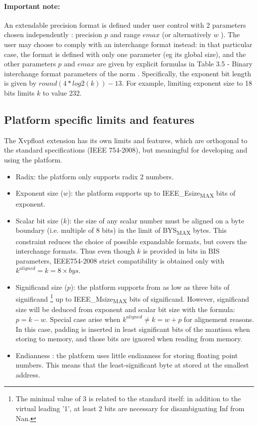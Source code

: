 \paragraph{Important note:} An extendable precision format is defined under user control with 2 parameters chosen independently : precision $p$ and range $emax$ (or alternatively $w$ ).
The user may choose to comply with an interchange format instead: in that particular case, the format is defined with only one parameter (eg its global size), and the other parameters $p$ and $emax$ are given by explicit formulas in Table 3.5 - Binary interchange format parameters of the norm \cite{IEEE754}.
Specifically, the exponent bit length is given by $round(4*log2(k))-13$. 
For example, limiting exponent size to 18 bits limits $k$ to value 232.

\subsection{Platform specific limits and features}

The Xvpfloat extension has its own limits and features, which are orthogonal to
the standard specifications (IEEE 754-2008), but meaningful for developing and using the platform.

\begin{itemize}[topsep=0pt]
\item Radix: the platform only supports radix 2 numbers.
\item Exponent size ($w$): the platform supports up to IEEE\_Esize\textsubscript{MAX} bits of exponent.
\item Scalar bit size ($k$): the size of any scalar number must be aligned on a byte boundary (i.e. multiple of 8 bits) in the limit of BYS\textsubscript{MAX} bytes.
This constraint reduces the choice of possible expandable formats, but covers the interchange formats.
Thus even though $k$ is provided in bits in BIS parameters, IEEE754-2008 strict compatibility is obtained only with $k^{aligned} = k = 8 \times bys$.
\item Significand size ($p$): the platform supports from as low as three bits of significand \footnote{The minimal value of 3 is related to the standard itself: in addition to the virtual leading '1', at least 2 bits are necessary for disambiguating Inf from Nan.} up to IEEE\_Msize\textsubscript{MAX} bits of significand.
However, significand size will be deduced from exponent and scalar bit size with the formula: $p=k-w$.
Special case arise when $k^{aligned} \neq k=w+p$ for alignement reasons.
In this case, padding is inserted in least significant bits of the mantissa when storing to memory, and those bits are ignored when reading from memory.
\item Endianness : the platform uses little endianness for storing floating point numbers.
This means that the least-significant byte at stored at the smallest address.
\end{itemize}

